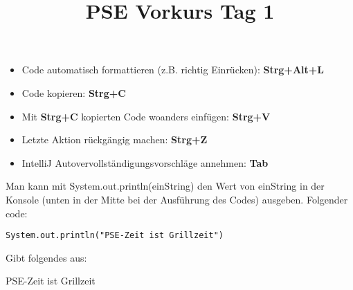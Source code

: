 \documentclass{../../sheet}
\title{PSE Vorkurs Tag 1}
\begin{document}
\maketitle

\begin{itemize}
    \item Code automatisch formattieren (z.B. richtig Einrücken): \textbf{Strg+Alt+L}
    \item Code kopieren: \textbf{Strg+C}
    \item Mit \textbf{Strg+C} kopierten Code woanders einfügen: \textbf{Strg+V}
    \item Letzte Aktion rückgängig machen: \textbf{Strg+Z}
    \item IntelliJ Autovervollständigungsvorschläge annehmen: \textbf{Tab}
\end{itemize}
\newpage


Man kann mit System.out.println(einString) den Wert von einString in der Konsole (unten in der Mitte bei der Ausführung des Codes) ausgeben. Folgender code:
\begin{verbatim}
System.out.println("PSE-Zeit ist Grillzeit")
\end{verbatim}
Gibt folgendes aus:
\begin{ausgabe}
    PSE-Zeit ist Grillzeit
\end{ausgabe}
\end{document}
